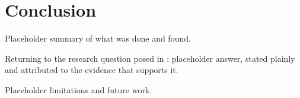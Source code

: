 \chapter{Conclusion}
\label{sec:conclusion}

%
%

Placeholder summary of what was done and found.

%
%

Returning to the research question posed in :
placeholder answer, stated plainly and attributed to the evidence that
supports it.

Placeholder limitations and future work.
